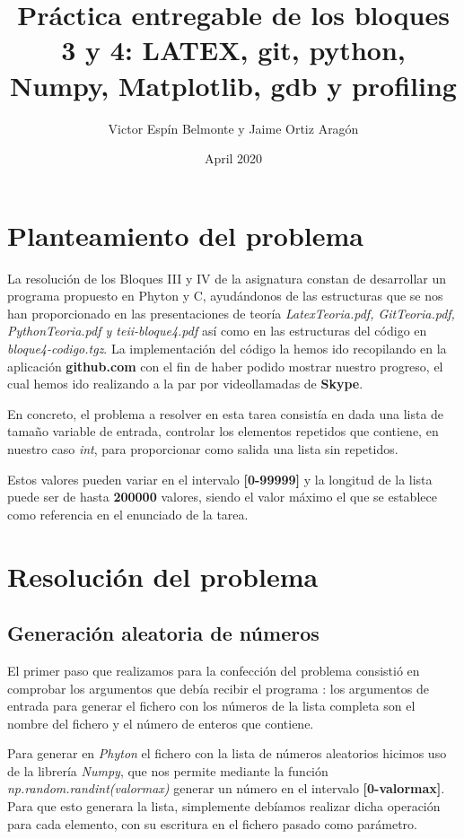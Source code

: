 \documentclass{article}
\title{Práctica entregable de los bloques 3 y 4: 
\newline LATEX, git, python, Numpy, Matplotlib, gdb y profiling}
\author{ Victor Espín Belmonte y Jaime Ortiz Aragón }
\date{April 2020}
\begin{document}
\maketitle

\section{Planteamiento del problema}
La resolución de los Bloques III y IV de la asignatura constan de desarrollar un programa propuesto en Phyton y C, ayudándonos de las estructuras que se nos han proporcionado en las presentaciones de teoría \textit{LatexTeoria.pdf, GitTeoria.pdf, PythonTeoria.pdf y teii-bloque4.pdf} así como en las estructuras del código en \textit{bloque4-codigo.tgz}. La implementación del código la hemos ido recopilando en la aplicación \textbf{github.com} con el fin de haber podido mostrar nuestro progreso, el cual hemos ido realizando a la par por videollamadas de \textbf{Skype}.

En concreto, el problema a resolver en esta tarea consistía en dada una lista de tamaño variable de entrada, controlar los elementos repetidos que contiene, en nuestro caso \textit{int}, para proporcionar como salida una lista sin repetidos.

Estos valores pueden variar en el intervalo \textbf{[0-99999]} y la longitud de la lista puede ser de hasta \textbf{200000} valores, siendo el valor máximo el que se establece como referencia en el enunciado de la tarea.


\section{Resolución del problema}
\subsection{Generación aleatoria de números}
El primer paso que realizamos para la confección del problema consistió en comprobar los argumentos que debía recibir el programa : los argumentos de entrada para generar el fichero con los números de la lista completa son el nombre del fichero y el número de enteros que contiene.

Para generar en \textit{Phyton} el fichero con la lista de números aleatorios hicimos uso de la librería \textit{Numpy}, que nos permite mediante la función \textit{np.random.randint(valormax)} generar un número en el intervalo \textbf{[0-valormax]}. Para que esto generara la lista, simplemente debíamos realizar dicha operación para cada elemento, con su escritura en el fichero pasado como parámetro.
\end{document}
